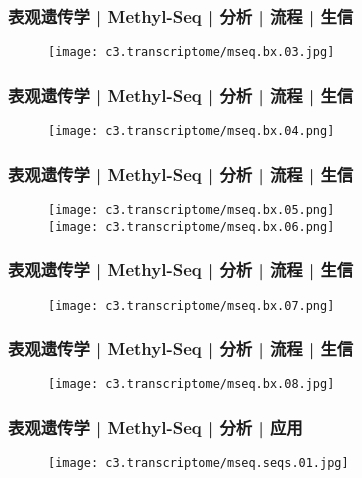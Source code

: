 \begin{frame}
  \frametitle{表观遗传学 | Methyl-Seq | 分析 | 流程 | 生信}
  \begin{figure}
    \centering
    \texttt{[image: c3.transcriptome/mseq.bx.03.jpg]}
  \end{figure}
\end{frame}

\begin{frame}
  \frametitle{表观遗传学 | Methyl-Seq | 分析 | 流程 | 生信}
  \begin{figure}
    \centering
    \texttt{[image: c3.transcriptome/mseq.bx.04.png]}
  \end{figure}
\end{frame}

\begin{frame}
  \frametitle{表观遗传学 | Methyl-Seq | 分析 | 流程 | 生信}
  \begin{figure}
    \centering
    \texttt{[image: c3.transcriptome/mseq.bx.05.png]}\\
    \texttt{[image: c3.transcriptome/mseq.bx.06.png]}
  \end{figure}
\end{frame}

\begin{frame}
  \frametitle{表观遗传学 | Methyl-Seq | 分析 | 流程 | 生信}
  \begin{figure}
    \centering
    \texttt{[image: c3.transcriptome/mseq.bx.07.png]}
  \end{figure}
\end{frame}

\begin{frame}
  \frametitle{表观遗传学 | Methyl-Seq | 分析 | 流程 | 生信}
  \begin{figure}
    \centering
    \texttt{[image: c3.transcriptome/mseq.bx.08.jpg]}
  \end{figure}
\end{frame}

\begin{frame}
  \frametitle{表观遗传学 | Methyl-Seq | 分析 | 应用}
  \begin{figure}
    \centering
    \texttt{[image: c3.transcriptome/mseq.seqs.01.jpg]}
  \end{figure}
\end{frame}

